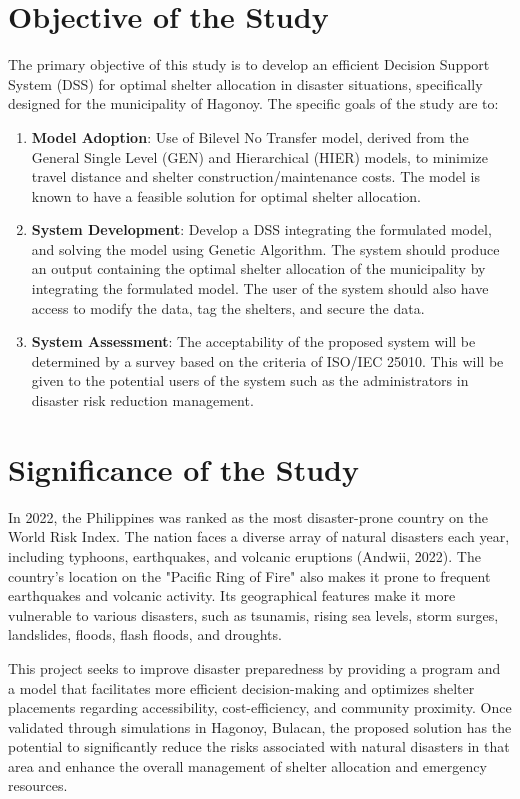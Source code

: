 \section{Objective of the Study}
The primary objective of this study is to develop an efficient Decision Support System (DSS) for optimal shelter allocation in disaster situations, specifically designed for the municipality of Hagonoy. The specific goals of the study are to:

\begin{enumerate}
	\item \textbf{Model Adoption}: Use of Bilevel No Transfer model, derived from the General Single Level (GEN) and Hierarchical (HIER) models, to minimize travel distance and shelter construction/maintenance costs. The model is known to have a feasible solution for optimal shelter allocation.
	
	\item \textbf{System Development}: Develop a DSS integrating the formulated model, and solving the model using Genetic Algorithm. The system should produce an output containing the optimal shelter allocation of the municipality by integrating the formulated model. The user of the system should also have access to modify the data, tag the shelters, and secure the data.
	
	\item \textbf{System Assessment}: The acceptability of the proposed system will be determined by a survey based on the criteria of ISO/IEC 25010. This will be given to the potential users of the system such as the administrators in disaster risk reduction management.
	
\end{enumerate}

\section{Significance of the Study}
In 2022, the Philippines was ranked as the most disaster-prone country on the World Risk Index. The nation faces a diverse array of natural disasters each year, including typhoons, earthquakes, and volcanic eruptions (Andwii, 2022). The country's location on the "Pacific Ring of Fire" also makes it prone to frequent earthquakes and volcanic activity. Its geographical features make it more vulnerable to various disasters, such as tsunamis, rising sea levels, storm surges, landslides, floods, flash floods, and droughts.

This project seeks to improve disaster preparedness by providing a program and a model that facilitates more efficient decision-making and optimizes shelter placements regarding accessibility, cost-efficiency, and community proximity. Once validated through simulations in Hagonoy, Bulacan, the proposed solution has the potential to significantly reduce the risks associated with natural disasters in that area and enhance the overall management of shelter allocation and emergency resources.


